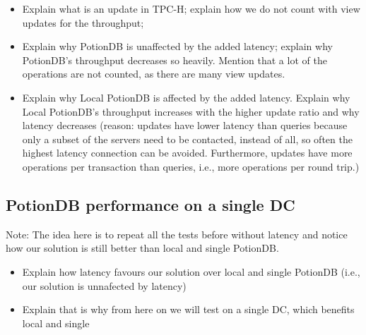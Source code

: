 \documentclass[sigplan,10pt]{acmart}
\begin{document}

\begin{itemize}
	\item Explain what is an update in TPC-H; explain how we do not count with view updates for the throughput;
	\item Explain why PotionDB is unaffected by the added latency; explain why PotionDB's throughput decreases so heavily. Mention that a lot of the operations are not counted, as there are many view updates.
	\item Explain why Local PotionDB is affected by the added latency. Explain why Local PotionDB's throughput increases with the higher update ratio and why latency decreases (reason: updates have lower latency than queries because only a subset of the servers need to be contacted, instead of all, so often the highest latency connection can be avoided. Furthermore, updates have more operations per transaction than queries, i.e., more operations per round trip.)
\end{itemize}

\subsection{PotionDB performance on a single DC}

Note: The idea here is to repeat all the tests before without latency and notice how our solution is still better than local and single PotionDB.

\begin{itemize}
	\item Explain how latency favours our solution over local and single PotionDB (i.e., our solution is unnafected by latency)
	\item Explain that is why from here on we will test on a single DC, which benefits local and single
\end{itemize}

\end{document}
